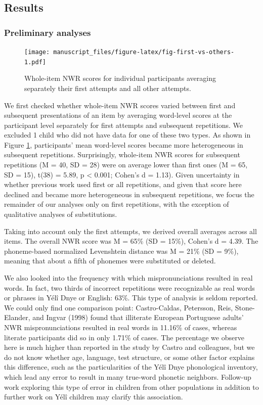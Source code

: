 \documentclass[
  american,
  ,man,floatsintext]{apa6}
\begin{document}
\hypertarget{results}{%
\subsection{Results}\label{results}}

\hypertarget{preliminary-analyses}{%
\subsubsection{Preliminary analyses}\label{preliminary-analyses}}

\begin{figure}
\centering
\texttt{[image: manuscript\_files/figure-latex/fig-first-vs-others-1.pdf]}
\caption{\label{fig:fig-first-vs-others}Whole-item NWR scores for individual participants averaging separately their first attempts and all other attempts.}
\end{figure}

We first checked whether whole-item NWR scores varied between first and subsequent presentations of an item by averaging word-level scores at the participant level separately for first attempts and subsequent repetitions. We excluded 1 child who did not have data for one of these two types. As shown in Figure \ref{fig:fig-first-vs-others}, participants' mean word-level scores became more heterogeneous in subsequent repetitions. Surprisingly, whole-item NWR scores for subsequent repetitions (M = 40, SD = 28)
were on average lower than first ones (M = 65, SD = 15), t(38) = 5.89, p \textless{} 0.001; Cohen's d = 1.13). Given uncertainty in whether previous work used first or all repetitions, and given that score here declined and became more heterogeneous in subsequent repetitions, we focus the remainder of our analyses only on first repetitions, with the exception of qualitative analyses of substitutions.

Taking into account only the first attempts, we derived overall averages across all items. The overall NWR score was M = 65\% (SD = 15\%), Cohen's d = 4.39. The phoneme-based normalized Levenshtein distance was M = 21\% (SD = 9\%), meaning that about a fifth of phonemes were substituted or deleted.

We also looked into the frequency with which mispronunciations resulted in real words. In fact, two thirds of incorrect repetitions were recognizable as real words or phrases in Yélî Dnye or English: 63\%. This type of analysis is seldom reported. We could only find one comparison point: Castro-Caldas, Petersson, Reis, Stone-Elander, and Ingvar (1998) found that illiterate European Portuguese adults' NWR mispronunciations resulted in real words in 11.16\% of cases, whereas literate participants did so in only 1.71\% of cases. The percentage we observe here is much higher than reported in the study by Castro and colleagues, but we do not know whether age, language, test structure, or some other factor explains this difference, such as the particularities of the Yélî Dnye phonological inventory, which lead any error to result in many true-word phonetic neighbors. Follow-up work exploring this type of error in children from other populations in addition to further work on Yélî children may clarify this association.
\end{document}
